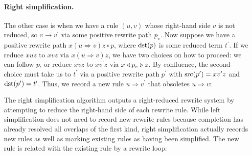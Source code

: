 \documentclass[../generics]{subfiles}
\begin{document}
\paragraph{Right simplification.} The other case is when we have a rule $(u, v)$ whose right-hand side $v$ is not reduced, so $v\rightarrow v^\prime$ via some positive rewrite path $p_v$. Now suppose we have a positive rewrite path $x(u\Rightarrow v)z\circ p$, where $\operatorname{dst}(p)$ is some reduced term $t^\prime$. If we reduce $xuz$ to $xvz$ via $x(u\Rightarrow v)z$, we have two choices on how to proceed: we can follow $p$, or reduce $xvz$ to $xv^\prime z$ via $x\triangleleft p_v \triangleright z$. By confluence, the second choice must take us to $t^\prime$ via a positive rewrite path $p^\prime$ with $\operatorname{src}(p^\prime)=xv^\prime z$ and $\operatorname{dst}(p^\prime)=t^\prime$. Thus, we record a new rule $u\Rightarrow v^\prime$ that obsoletes $u\Rightarrow v$:
\begin{center}
\end{center}
The right simplification algorithm outputs a right-reduced rewrite system by attempting to reduce the right-hand side of each rewrite rule. While left simplification does not need to record new rewrite rules because completion has already resolved all overlaps of the first kind, right simplification actually records new rules as well as marking existing rules as having been simplified. The new rule is related with the existing rule by a rewrite loop:
\begin{center}
\end{center}
\end{document}
